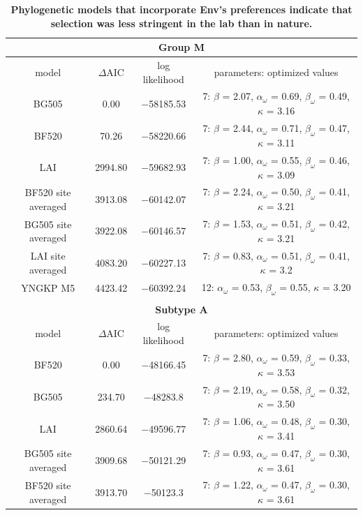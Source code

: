 \documentclass[9pt,lineno]{elife}
\begin{document}
\begin{table}
\centering
\caption{
{\bf Phylogenetic models that incorporate Env's preferences indicate that selection was less stringent in the lab than in nature.}}
{\footnotesize
\begin{tabular}{cccc}
\multicolumn{4}{c}{\bf{Group M}}\\
\hline
model & $\Delta$AIC & log likelihood & parameters: optimized values \\ 
\hline
BG505 & 0.00 & $-$58185.53 & 7: $\beta$ = 2.07, $\alpha_\omega$ = 0.69, $\beta_\omega$ = 0.49, $\kappa$ = 3.16\\
BF520 & 70.26 & $-$58220.66 & 7: $\beta$ = 2.44, $\alpha_\omega$ = 0.71, $\beta_\omega$ = 0.47, $\kappa$ = 3.11\\
LAI & 2994.80 & $-$59682.93 & 7: $\beta$ = 1.00, $\alpha_\omega$ = 0.55, $\beta_\omega$ = 0.46, $\kappa$ = 3.09\\
BF520 site averaged & 3913.08 & $-$60142.07 & 7: $\beta$ = 2.24, $\alpha_\omega$ = 0.50, $\beta_\omega$ = 0.41, $\kappa$ = 3.21\\
BG505 site averaged & 3922.08 & $-$60146.57 & 7: $\beta$ = 1.53, $\alpha_\omega$ = 0.51, $\beta_\omega$ = 0.42, $\kappa$ = 3.21\\
LAI site averaged & 4083.20 & $-$60227.13 & 7: $\beta$ = 0.83, $\alpha_\omega$ = 0.51, $\beta_\omega$ = 0.41, $\kappa$ = 3.2\\
YNGKP M5 & 4423.42 & $-$60392.24 & 12: $\alpha_\omega$ = 0.53, $\beta_\omega$ = 0.55, $\kappa$ = 3.20\\
\\
\multicolumn{4}{c}{\bf{Subtype A}}\\
\hline
model & $\Delta$AIC & log likelihood & parameters: optimized values \\ 
\hline
BF520 & 0.00 & $-$48166.45 & 7: $\beta$ = 2.80, $\alpha_\omega$ = 0.59, $\beta_\omega$ = 0.33, $\kappa$ = 3.53\\
BG505 & 234.70 & $-$48283.8 & 7: $\beta$ = 2.19, $\alpha_\omega$ = 0.58, $\beta_\omega$ = 0.32, $\kappa$ = 3.50\\
LAI & 2860.64 & $-$49596.77 & 7: $\beta$ = 1.06, $\alpha_\omega$ = 0.48, $\beta_\omega$ = 0.30, $\kappa$ = 3.41\\
BG505 site averaged & 3909.68 & $-$50121.29 & 7: $\beta$ = 0.93, $\alpha_\omega$ = 0.47, $\beta_\omega$ = 0.30, $\kappa$ = 3.61\\
BF520 site averaged & 3913.70 & $-$50123.3 & 7: $\beta$ = 1.22, $\alpha_\omega$ = 0.47, $\beta_\omega$ = 0.30, $\kappa$ = 3.61\\

\end{tabular}}
\end{table}
\end{document}
